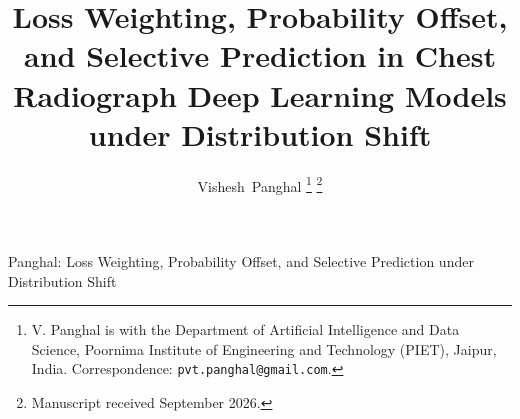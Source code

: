 \documentclass[journal]{IEEEtran}
\begin{document}
\title{Loss Weighting, Probability Offset, and Selective Prediction in Chest Radiograph Deep Learning Models under Distribution Shift}

\author{Vishesh~Panghal%
\thanks{V. Panghal is with the Department of Artificial Intelligence and Data Science, Poornima Institute of Engineering and Technology (PIET), Jaipur, India. Correspondence: \texttt{pvt.panghal@gmail.com}.}%
\thanks{Manuscript received September 2026.}}

%
{Panghal: Loss Weighting, Probability Offset, and Selective Prediction under Distribution Shift}

\maketitle
\end{document}
